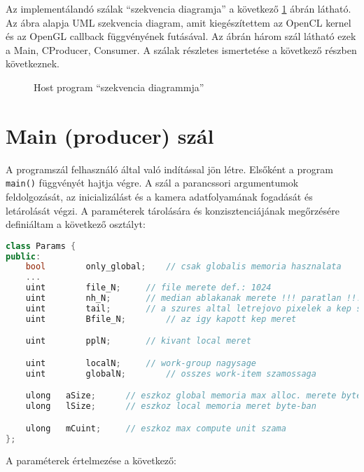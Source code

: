 	Az implementálandó szálak ``szekvencia diagramja'' a következő \ref{fig:host_seq} ábrán látható.
	Az ábra alapja UML szekvencia diagram, amit kiegészítettem az OpenCL kernel
	és az OpenGL callback függvényének futásával. Az ábrán három szál látható ezek a Main, CProducer, Consumer.
	A szálak részletes ismertetése a következő részben következnek.
	\newpage
	 
\begin{figure}[H]
\resizebox{\linewidth}{!}{}
	\caption{Host program ``szekvencia diagrammja''}
	\label{fig:host_seq}
\end{figure}

	
\section{Main (producer) szál}
	A programszál felhasználó által való indítással jön
        létre. Elsőként a program \texttt{main()} függvényét hajtja végre. A szál a
	parancssori argumentumok feldolgozását, az inicializálást és a kamera adatfolyamának fogadását és letárolását végzi.
	A paraméterek tárolására és konzisztenciájának megőrzésére definiáltam a következő osztályt:
\begin{lstlisting}[language=C++]	
class Params {
public:
	bool		only_global;	// csak globalis memoria hasznalata
	...
	uint		file_N;		// file merete def.: 1024
	uint		nh_N;		// median ablakanak merete !!! paratlan !!!
	uint		tail;		// a szures altal letrejovo pixelek a kep szelen 
	uint		Bfile_N;		// az igy kapott kep meret

	uint		pplN;		// kivant local meret

	uint		localN;		// work-group nagysage
	uint		globalN;		// osszes work-item szamossaga

	ulong	aSize;		// eszkoz global memoria max alloc. merete byte-ban
	ulong	lSize;		// eszkoz local memoria meret byte-ban

	ulong	mCuint;		// eszkoz max compute unit szama
};
\end{lstlisting}
	A paraméterek értelmezése a következő:
